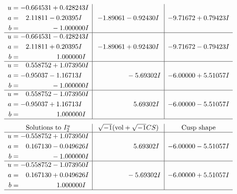 \documentclass[1p]{elsarticle_modified}
\theoremstyle{definition}
\newcommand{\I}{\sqrt{-1}}
\begin{document}
$$\begin{array}{c|c|c}
\begin{aligned}
u &= -0.664531 + 0.428243 I \\
a &= \phantom{-}2.11811 - 0.20395 I \\
b &= \phantom{-0.000000 } -1.000000 I\end{aligned}
 & -1.89061 - 0.92430 I & -9.71672 + 0.79423 I \\ \hline\begin{aligned}
u &= -0.664531 - 0.428243 I \\
a &= \phantom{-}2.11811 + 0.20395 I \\
b &= \phantom{-0.000000 -}1.000000 I\end{aligned}
 & -1.89061 + 0.92430 I & -9.71672 - 0.79423 I \\ \hline\begin{aligned}
u &= \phantom{-}0.558752 + 1.073950 I \\
a &= -0.95037 - 1.16713 I \\
b &= \phantom{-0.000000 } -1.000000 I\end{aligned}
 & \phantom{-0.000000 } -5.69302 I & -6.00000 + 5.51057 I \\ \hline\begin{aligned}
u &= \phantom{-}0.558752 - 1.073950 I \\
a &= -0.95037 + 1.16713 I \\
b &= \phantom{-0.000000 -}1.000000 I\end{aligned}
 & \phantom{-0.000000 -}5.69302 I & -6.00000 - 5.51057 I\\
 \hline 
 \end{array}$$\newpage$$\begin{array}{c|c|c}  
\text{Solutions to }I^u_{2}& \I (\text{vol} + \sqrt{-1}CS) & \text{Cusp shape}\\
 \hline 
\begin{aligned}
u &= -0.558752 + 1.073950 I \\
a &= \phantom{-}0.167130 - 0.049626 I \\
b &= \phantom{-0.000000 } -1.000000 I\end{aligned}
 & \phantom{-0.000000 -}5.69302 I & -6.00000 - 5.51057 I \\ \hline\begin{aligned}
u &= -0.558752 - 1.073950 I \\
a &= \phantom{-}0.167130 + 0.049626 I \\
b &= \phantom{-0.000000 -}1.000000 I\end{aligned}
 & \phantom{-0.000000 } -5.69302 I & -6.00000 + 5.51057 I\\
 \hline 
 \end{array}$$\newpage\newpage\renewcommand{\arraystretch}{1}
\end{document}
